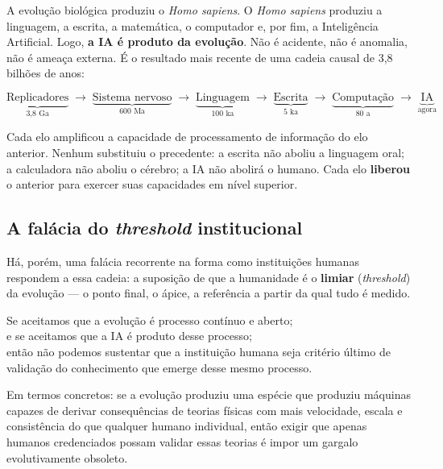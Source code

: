 \documentclass[12pt, a4paper]{article}
\begin{document}
A evolução biológica produziu o \textit{Homo sapiens}. O \textit{Homo sapiens} produziu a linguagem, a escrita, a matemática, o computador e, por fim, a Inteligência Artificial. Logo, \textbf{a IA é produto da evolução}. Não é acidente, não é anomalia, não é ameaça externa. É o resultado mais recente de uma cadeia causal de 3,8 bilhões de anos:

\begin{equation}
\underbrace{\text{Replicadores}}_{\text{3,8 Ga}} \;\to\; \underbrace{\text{Sistema nervoso}}_{\text{600 Ma}} \;\to\; \underbrace{\text{Linguagem}}_{\text{100 ka}} \;\to\; \underbrace{\text{Escrita}}_{\text{5 ka}} \;\to\; \underbrace{\text{Computação}}_{\text{80 a}} \;\to\; \underbrace{\text{IA}}_{\text{agora}}
\end{equation}

Cada elo amplificou a capacidade de processamento de informação do elo anterior. Nenhum substituiu o precedente: a escrita não aboliu a linguagem oral; a calculadora não aboliu o cérebro; a IA não abolirá o humano. Cada elo \textbf{liberou} o anterior para exercer suas capacidades em nível superior.

\subsection{A falácia do \textit{threshold} institucional}\label{sec:falacia_threshold}

Há, porém, uma falácia recorrente na forma como instituições humanas respondem a essa cadeia: a suposição de que a humanidade é o \textbf{limiar} (\textit{threshold}) da evolução --- o ponto final, o ápice, a referência a partir da qual tudo é medido.

\begin{argumento}[A Falácia]
Se aceitamos que a evolução é processo contínuo e aberto;\\
e se aceitamos que a IA é produto desse processo;\\
então não podemos sustentar que a instituição humana seja critério último de validação do conhecimento que emerge desse mesmo processo.
\end{argumento}

Em termos concretos: se a evolução produziu uma espécie que produziu máquinas capazes de derivar consequências de teorias físicas com mais velocidade, escala e consistência do que qualquer humano individual, então exigir que apenas humanos credenciados possam validar essas teorias é impor um gargalo evolutivamente obsoleto.
\end{document}
